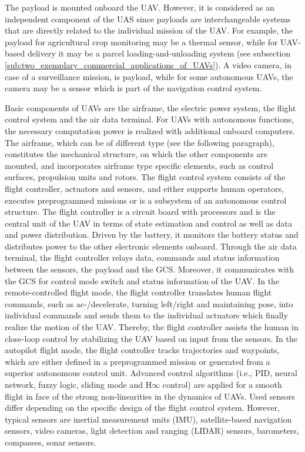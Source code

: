 The payload is mounted onboard the UAV.
However, it is considered as an independent component of the UAS since payloads are interchangeable systems 
that are directly related to the individual mission of the UAV.
For example, the payload for agricultural crop monitoring may be a thermal sensor,
while for UAV-based delivery it may be a parcel loading-and-unloading system (see subsection \ref{sub:two_exemplary_commercial_applications_of_UAVs}).
A video camera, in case of a surveillance mission, is payload, 
while for some autonomous UAVs, the camera may be a sensor which is part of the navigation control system.

Basic components of UAVs are the airframe, the electric power system, the flight control system and the air data terminal.
For UAVs with autonomous functions, the necessary computation power is realized with additional onboard computers.
The airframe, which can be of different type (see the following paragraph),
constitutes the mechanical structure, on which the other components are mounted,
and incorporates airframe type specific elements, such as control surfaces, propulsion units and rotors.
The flight control system consists of the flight controller, actuators and sensors,
and either supports human operators, executes preprogrammed missions or is a subsystem of an autonomous control structure.
The flight controller is a circuit board with processors and
is the central unit of the UAV in terms of state estimation and control as well as data and power distribution.
Driven by the battery, it monitors the battery status and distributes power to the other electronic elements onboard.
Through the air data terminal, the flight controller relays data, commands and status information between the sensors, the payload and the GCS.
Moreover, it communicates with the GCS for control mode switch and status information of the UAV.
In the remote-controlled flight mode, the flight controller translates human flight commands,
such as ac-/decelerate, turning left/right and maintaining pose, 
into individual commands and sends them to the individual actuators which finally realize the motion of the UAV.
Thereby, the flight controller assists the human in close-loop control by stabilizing the UAV based on input from the sensors.
In the autopilot flight mode, the flight controller tracks trajectories and waypoints,
which are either defined in a preprogrammed mission or generated from a superior autonomous control unit.
Advanced control algorithms (i.e., PID, neural network, fuzzy logic, sliding mode and H$\infty$  control)
are applied for a smooth flight in face of the strong non-linearities in the dynamics of UAVs. \cite{Chao2010}
Used sensors differ depending on the specific design of the flight control system.
However, typical sensors are inertial measurement units (IMU), satellite-based navigation sensors, 
video cameras, light detection and ranging (LIDAR) sensors, barometers, compasses, sonar sensors.

